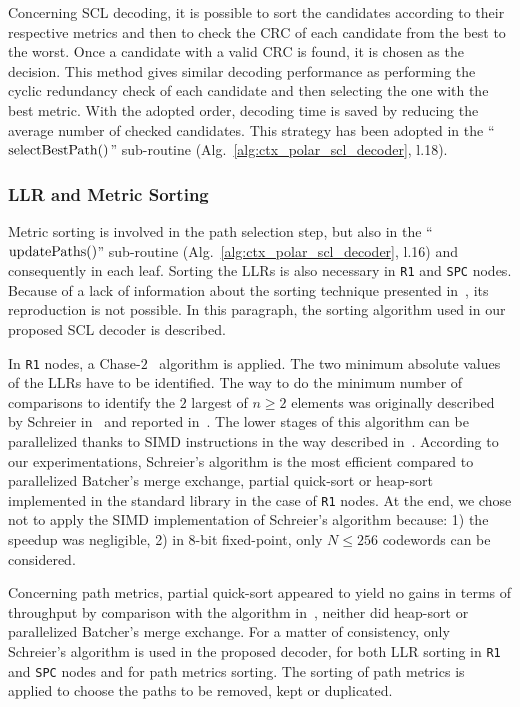 Concerning SCL decoding, it is possible to sort the candidates according to
their respective metrics and then to check the CRC of each candidate from the
best to the worst. Once a candidate with a valid CRC is found, it is chosen as
the decision. This method gives similar decoding performance as performing the
cyclic redundancy check of each candidate and then selecting the one with the
best metric. With the adopted order, decoding time is saved by reducing the
average number of checked candidates. This strategy has been adopted in the
``$\operatorname*{selectBestPath}()$'' sub-routine (Alg.~\ref{alg:ctx_polar_scl_decoder},
l.18).

\subsubsection{LLR and Metric Sorting}
\label{sec:opt_polar_scl_sorting}

Metric sorting is involved in the path selection step, but also
in the ``$\operatorname*{updatePaths}()$'' sub-routine (Alg.~\ref{alg:ctx_polar_scl_decoder},
l.16) and consequently in each leaf. Sorting the LLRs is also necessary in
\verb|R1| and \verb|SPC| nodes. Because of a lack of information about the
sorting technique presented in~\cite{Sarkis2016}, its reproduction is not
possible. In this paragraph, the sorting algorithm used in our proposed SCL
decoder is described.

In \verb|R1| nodes, a Chase-$2$~\cite{Chase1972} algorithm is applied. The two
minimum absolute values of the LLRs have to be identified. The way to do the
minimum number of comparisons to identify the $2$ largest of $n\geq2$ elements
was originally described by Schreier in~\cite{Schreier1932} and reported
in~\cite{Knuth1973}. The lower stages of this algorithm can be parallelized
thanks to SIMD instructions in the way described in~\cite{Furtak2007}. According
to our experimentations, Schreier's algorithm is the most efficient compared to
parallelized Batcher's merge exchange, partial quick-sort or heap-sort
implemented in the \Cxx standard library in the case of \verb|R1| nodes. At the
end, we chose not to apply the SIMD implementation of Schreier's algorithm
because: 1) the speedup was negligible, 2) in 8-bit fixed-point, only
$N \leq 256$ codewords can be considered.

Concerning path metrics, partial quick-sort appeared to yield no gains in terms
of throughput by comparison with the algorithm in~\cite{Schreier1932}, neither
did heap-sort or parallelized Batcher's merge exchange. For a matter of
consistency, only Schreier's algorithm is used in the proposed decoder, for both
LLR sorting in \verb|R1| and \verb|SPC| nodes and for path metrics sorting. The
sorting of path metrics is applied to choose the paths to be removed, kept or
duplicated.

